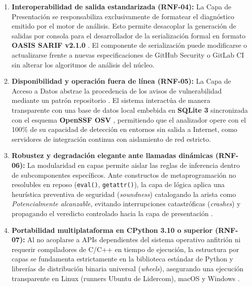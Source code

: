 \begin{enumerate}
    \item \textbf{Interoperabilidad de salida estandarizada (RNF-04):} 
    La Capa de Presentación se responsabiliza exclusivamente de formatear el diagnóstico emitido por el motor de análisis. Esto permite desacoplar la generación de salidas por consola para el desarrollador de la serialización formal en formato \textbf{OASIS SARIF v2.1.0} \cite{oasis2019sarif}. El componente de serialización puede modificarse o actualizarse frente a nuevas especificaciones de GitHub Security o GitLab CI sin alterar los algoritmos de análisis del núcleo.

    \item \textbf{Disponibilidad y operación fuera de línea (RNF-05):} 
    La Capa de Acceso a Datos abstrae la procedencia de los avisos de vulnerabilidad mediante un patrón repositorio \cite{martin2017cleanarch}. El sistema interactúa de manera transparente con una base de datos local embebida en \textbf{SQLite 3} sincronizada con el esquema \textbf{OpenSSF OSV} \cite{openssf2023osv}, permitiendo que el analizador opere con el 100\% de su capacidad de detección en entornos sin salida a Internet, como servidores de integración continua con aislamiento de red estricto.

    \item \textbf{Robustez y degradación elegante ante llamadas dinámicas (RNF-06):} 
    La modularidad en capas permite aislar las reglas de inferencia dentro de subcomponentes específicos. Ante constructos de metaprogramación no resolubles en reposo (\texttt{eval()}, \texttt{getattr()}), la capa de lógica aplica una heurística preventiva de seguridad (\textit{soundness}) catalogando la arista como \textit{Potencialmente alcanzable}, evitando interrupciones catastróficas (\textit{crashes}) y propagando el veredicto controlado hacia la capa de presentación \cite{nielson1999principles, salis2021pycg}.

    \item \textbf{Portabilidad multiplataforma en CPython 3.10 o superior (RNF-07):} 
    Al no acoplarse a APIs dependientes del sistema operativo anfitrión ni requerir compiladores de C/C++ en tiempo de ejecución, la estructura por capas se fundamenta estrictamente en la biblioteca estándar de Python y librerías de distribución binaria universal (\textit{wheels}), asegurando una ejecución transparente en Linux (runners Ubuntu de Lidercom), macOS y Windows \cite{pressman2020software}.
\end{enumerate}

